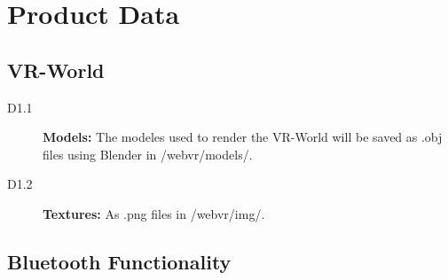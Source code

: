 \section{Product Data}

\subsection{VR-World}

\begin{description}
  \item[D1.1] \textbf{Models:} The modeles used to render the VR-World will be saved as .obj files using Blender in /webvr/models/.
  \item[D1.2] \textbf{Textures:} As .png files in /webvr/img/.
\end{description}

\subsection{Bluetooth Functionality}

